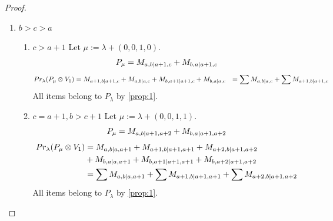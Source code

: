 \begin{proof}
\begin{enumerate}
\begin{enumerate}
\item $c=a+1$
        Let $\mu:=\lambda + (0,0,1,1) $. 
\begin{equation}\notag
  \begin{aligned}
      P_{\mu} =
M_{a,b|a+1,a+2}
  \end{aligned}
\end{equation}
\begin{equation}\notag
  \begin{aligned}
  Pr_{\lambda}(P_\mu \otimes V_3) &=
M_{a,b|a,a+1}
+M_{a+1,b|a+1,a+1}
+M_{a+2,b|a+1,a+2}
  \end{aligned}
\end{equation}
All items belong to $P_\lambda$ by \cref{prop:1}.
  \end{enumerate}
  
\item $b>c>a$
  \begin{enumerate}
    \item $c>a+1$
        Let $\mu:=\lambda + (0,0,1,0) $. 
\begin{equation}\notag
  \begin{aligned}
      P_{\mu} =M_{a,b|a+1,c}
+M_{b,a|a+1,c}
  \end{aligned}
\end{equation}
\begin{equation}\notag
  \begin{aligned}
  Pr_{\lambda}(P_\mu \otimes V_1) &=
M_{a+1,b|a+1,c}
+M_{a,b|a,c}
+M_{b,a+1|a+1,c}
+M_{b,a|a,c}
                                  &=
\sum M_{a,b|a,c}
+\sum M_{a+1,b|a+1,c}
  \end{aligned}
\end{equation}
All items belong to $P_\lambda$ by \cref{prop:1}.

  \item $c=a+1,b>c+1$
   Let $\mu:=\lambda + (0,0,1,1) $. 
\begin{equation}\notag
  \begin{aligned}
      P_{\mu} =
M_{a,b|a+1,a+2}
+M_{b,a|a+1,a+2}
  \end{aligned}
\end{equation}
\begin{equation}\notag
  \begin{aligned}
  Pr_{\lambda}(P_\mu \otimes V_1) &=
M_{a,b|a,a+1}
+M_{a+1,b|a+1,a+1}
+M_{a+2,b|a+1,a+2} \\
                                  &+
M_{b,a|a,a+1}
+M_{b,a+1|a+1,a+1}
+M_{b,a+2|a+1,a+2}\\
                                  &=
\sum M_{a,b|a,a+1}
+\sum M_{a+1,b|a+1,a+1}
+\sum M_{a+2,b|a+1,a+2}
  \end{aligned}
\end{equation}
All items belong to $P_\lambda$ by \cref{prop:1}.


\end{enumerate}
\end{enumerate}
\end{proof}
